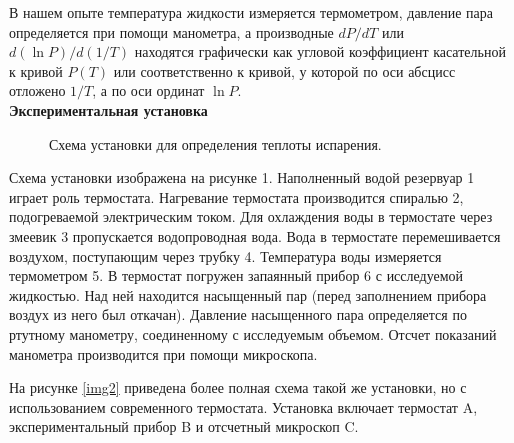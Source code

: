\documentclass[a4paper, 12pt]{article}%
\begin{document}
	В нашем опыте температура жидкости измеряется термометром, давление пара определяется при помощи манометра, а производные $ dP/dT $ или $ d(\ln P)/d(1/T) $ находятся графически как угловой коэффициент касательной к кривой $ P(T) $ или соответственно к кривой, у которой по оси абсцисс отложено $ 1/T $, а по оси ординат $ \ln P $.\\
	
    \textbf{Экспериментальная установка}\\
	
	\begin{figure}[H]
		\caption{Схема установки для определения теплоты испарения.}
	\end{figure}

	Схема установки изображена на рисунке 1. Наполненный водой резервуар 1 играет роль термостата. Нагревание термостата производится спиралью 2, подогреваемой электрическим током. Для охлаждения воды в термостате через змеевик 3 пропускается водопроводная вода. Вода в термостате перемешивается воздухом, поступающим через трубку 4. Температура воды измеряется термометром 5. В термостат погружен запаянный прибор 6 с исследуемой жидкостью. Над ней находится насыщенный пар (перед заполнением прибора воздух из него был откачан). Давление насыщенного пара определяется по ртутному манометру, соединенному с исследуемым объемом. Отсчет показаний манометра производится при помощи микроскопа.
	
	На рисунке \ref{img2} приведена более полная схема такой же установки, но с использованием современного термостата. Установка включает термостат A, экспериментальный прибор B и отсчетный микроскоп C.
	
\end{document}

